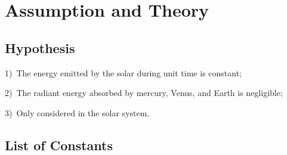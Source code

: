 \documentclass[../Paper.tex]{subfiles}
\begin{document}
\section{Assumption and Theory}

\subsection{Hypothesis}

1)~The energy emitted by the solar during unit time is constant; 

2)~The radiant energy absorbed by mercury, Venus, and Earth is negligible; 

3)~Only considered in the solar system. 

\subsection{List of Constants}
\end{document}
